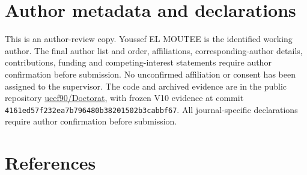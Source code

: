 \documentclass[
  11pt,
]{article}
\begin{document}
\hypertarget{author-metadata-and-declarations}{%
\section{Author metadata and
declarations}\label{author-metadata-and-declarations}}

This is an author-review copy. Youssef EL MOUTEE is the identified
working author. The final author list and order, affiliations,
corresponding-author details, contributions, funding and
competing-interest statements require author confirmation before
submission. No unconfirmed affiliation or consent has been assigned to
the supervisor. The code and archived evidence are in the public
repository \href{https://github.com/ucef90/Doctorat}{ucef90/Doctorat},
with frozen V10 evidence at commit
\texttt{4161ed57f232ea7b796480b38201502b3cabbf67}. All journal-specific
declarations require author confirmation before submission.

\hypertarget{references}{%
\section*{References}\label{references}}
\end{document}
